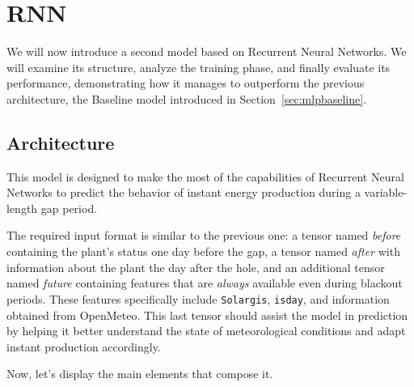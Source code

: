 \section{RNN}
We will now introduce a second model based on Recurrent Neural Networks.
We will examine its structure, analyze the training phase,
and finally evaluate its performance, demonstrating how it manages
to outperform the previous architecture, the Baseline model introduced in Section~\ref{sec:mlpbaseline}.


\subsection{Architecture}
This model is designed to make the most of the capabilities of
Recurrent Neural Networks to predict the behavior of instant
energy production during a variable-length gap period.

The required input format is similar to the previous one:
a tensor named \textit{before} containing the plant's status
one day before the gap, a tensor named \textit{after} with information
about the plant the day after the hole, and an additional tensor
named \textit{future} containing features that are \textit{always} available
even during blackout periods.
These features specifically include \verb|Solargis|, \verb|isday|,
and information obtained from OpenMeteo.
This last tensor should assist the model in prediction by helping
it better understand the state of meteorological conditions
and adapt instant production accordingly.

Now, let's display the main elements that compose it.

%
%

